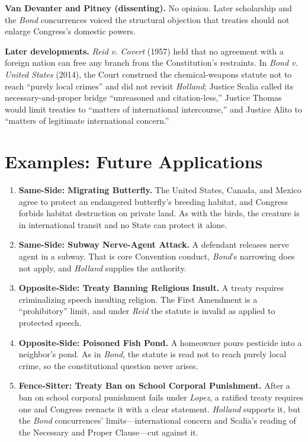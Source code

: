 \documentclass[12pt]{article}
\begin{document}
\textbf{Van Devanter and Pitney (dissenting).} No opinion. Later scholarship and the \textit{Bond} concurrences voiced the structural objection that treaties should not enlarge Congress's domestic powers.

\textbf{Later developments.} \textit{Reid v. Covert} (1957) held that no agreement with a foreign nation can free any branch from the Constitution's restraints. In \textit{Bond v. United States} (2014), the Court construed the chemical-weapons statute not to reach ``purely local crimes'' and did not revisit \textit{Holland}; Justice Scalia called its necessary-and-proper bridge ``unreasoned and citation-less,'' Justice Thomas would limit treaties to ``matters of international intercourse,'' and Justice Alito to ``matters of legitimate international concern.''

\section{Examples: Future Applications}

\begin{enumerate}
\item \textbf{Same-Side: Migrating Butterfly.} The United States, Canada, and Mexico agree to protect an endangered butterfly's breeding habitat, and Congress forbids habitat destruction on private land. As with the birds, the creature is in international transit and no State can protect it alone.
\item \textbf{Same-Side: Subway Nerve-Agent Attack.} A defendant releases nerve agent in a subway. That is core Convention conduct, \textit{Bond}'s narrowing does not apply, and \textit{Holland} supplies the authority.
\item \textbf{Opposite-Side: Treaty Banning Religious Insult.} A treaty requires criminalizing speech insulting religion. The First Amendment is a ``prohibitory'' limit, and under \textit{Reid} the statute is invalid as applied to protected speech.
\item \textbf{Opposite-Side: Poisoned Fish Pond.} A homeowner pours pesticide into a neighbor's pond. As in \textit{Bond}, the statute is read not to reach purely local crime, so the constitutional question never arises.
\item \textbf{Fence-Sitter: Treaty Ban on School Corporal Punishment.} After a ban on school corporal punishment fails under \textit{Lopez}, a ratified treaty requires one and Congress reenacts it with a clear statement. \textit{Holland} supports it, but the \textit{Bond} concurrences' limits---international concern and Scalia's reading of the Necessary and Proper Clause---cut against it.
\end{enumerate}
\end{document}
